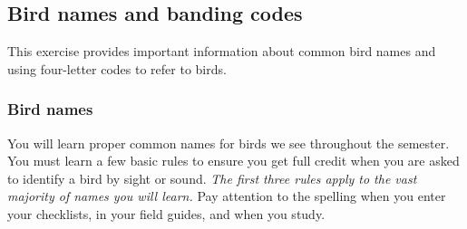 \documentclass[11pt]{article}
\begin{document}
\thispagestyle{plain}

\subsection*{Bird names and banding codes}

This exercise provides important information about common bird names and using four-letter codes to refer to birds.

\subsubsection*{Bird names}

You will learn proper common names for birds we see throughout the semester. You must learn a few basic rules to ensure you get full credit when you are asked to identify a bird by sight or sound.  \emph{The first three rules apply to the vast majority of names you will learn.} Pay attention to the spelling when you enter your checklists, in your field guides, and when you study.
\end{document}
